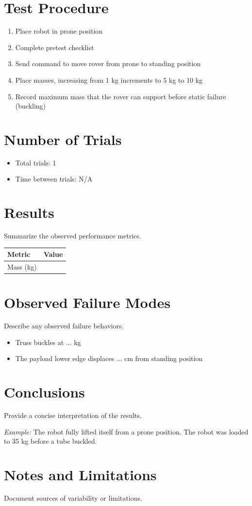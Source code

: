 \documentclass[11pt]{article}
\begin{document}
\section*{Test Procedure}
\begin{enumerate}[noitemsep]
    \item Place robot in prone position
    \item Complete pretest checklist
    \item Send command to move rover from prone to standing position
    \item Place masses, increasing from 1 kg increments to 5 kg to 10 kg
    \item Record maximum mass that the rover can support before static failure (buckling)

\end{enumerate}

\section*{Number of Trials}
\begin{itemize}[noitemsep]
    \item Total trials: 1
    \item Time between trials: N/A
\end{itemize}

\section*{Results}
Summarize the observed performance metrics.

\begin{center}
\begin{tabular}{lc}
\toprule
Metric & Value\\
\midrule
Mass (kg)&  \\
\end{tabular}
\end{center}

\section*{Observed Failure Modes}
Describe any observed failure behaviors.

\begin{itemize}[noitemsep]
    \item Truss buckles at ... kg
    \item The payload lower edge displaces ... cm from standing position
\end{itemize}

\section*{Conclusions}
Provide a concise interpretation of the results.

\textit{Example:} The robot fully lifted itself from a prone position. The robot was loaded to 35 kg before a tube buckled.

\section*{Notes and Limitations}
Document sources of variability or limitations.
\end{document}
